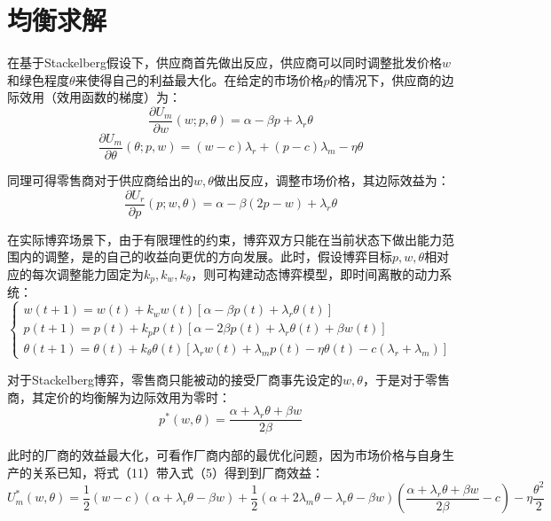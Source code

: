 \documentclass{article}
\begin{document}
\section{均衡求解}
\par 在基于Stackelberg假设下，供应商首先做出反应，供应商可以同时调整批发价格$w$和绿色程度$\theta$来使得自己的利益最大化。在给定的市场价格$p$的情况下，供应商的边际效用（效用函数的梯度）为：
\begin{equation}
    \frac{\partial U_m}{\partial w}(w;p,\theta)=\alpha-\beta p+\lambda_r\theta
\end{equation}
\begin{equation}
    \frac{\partial U_m}{\partial \theta}(\theta;p,w)=(w-c)\lambda_r+(p-c)\lambda_m-\eta\theta
\end{equation}
\par 同理可得零售商对于供应商给出的$w,\theta$做出反应，调整市场价格，其边际效益为：
\begin{equation}
    \frac{\partial U_r}{\partial p}(p;w,\theta)=\alpha-\beta (2p-w)+\lambda_r\theta
\end{equation}
\par 在实际博弈场景下，由于有限理性的约束，博弈双方只能在当前状态下做出能力范围内的调整，是的自己的收益向更优的方向发展。此时，假设博弈目标$p, w, \theta$相对应的每次调整能力固定为$k_p, k_w, k_\theta$，则可构建动态博弈模型，即时间离散的动力系统：
\begin{equation}  
    \left\{  
        \begin{array}{lr}
            w(t+1)=w(t)+k_ww(t)[\alpha-\beta p(t)+\lambda_r\theta(t)]               \\  
            p(t+1)=p(t)+k_pp(t)[\alpha-2\beta p(t)+\lambda_r\theta(t)+\beta w(t)]   \\  
            \theta(t+1)=\theta(t)+k_\theta\theta(t)[\lambda_rw(t)+\lambda_mp(t)-\eta\theta(t)-c(\lambda_r+\lambda_m)]
        \end{array}  
    \right.
\end{equation}  
\par 对于Stackelberg博弈，零售商只能被动的接受厂商事先设定的$w, \theta$，于是对于零售商，其定价的均衡解为边际效用为零时：
\begin{equation}
    p^*(w,\theta)=\frac{\alpha+\lambda_r\theta+\beta w}{2\beta}
\end{equation}
\par 此时的厂商的效益最大化，可看作厂商内部的最优化问题，因为市场价格与自身生产的关系已知，将式（11）带入式（5）得到到厂商效益：
\begin{equation}
    U_m^*(w,\theta)=\frac{1}{2}(w-c)(\alpha+\lambda_r\theta-\beta w)+\frac{1}{2}(\alpha+2\lambda_m\theta-\lambda_r\theta-\beta w)(\frac{\alpha+\lambda_r\theta+\beta w}{2\beta}-c)-\eta\frac{\theta^2}{2}
\end{equation}
\end{document}
